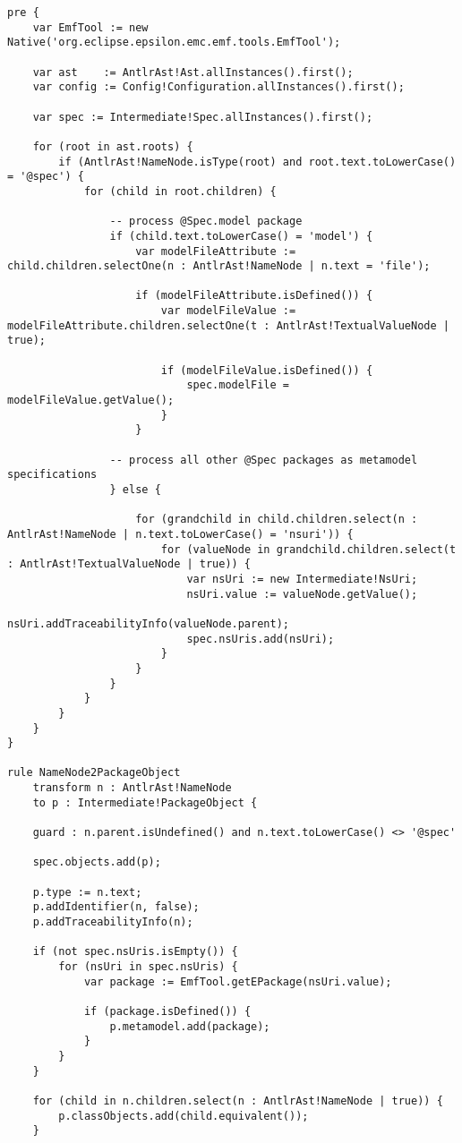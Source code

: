 \begin{lstlisting}[caption=Transforming AST models to intermediate models with ETL., label=lst:m2m_full, language=ETL]
pre {
	var EmfTool := new Native('org.eclipse.epsilon.emc.emf.tools.EmfTool');

	var ast    := AntlrAst!Ast.allInstances().first();
	var config := Config!Configuration.allInstances().first();
	
	var spec := Intermediate!Spec.allInstances().first();
	
	for (root in ast.roots) {
		if (AntlrAst!NameNode.isType(root) and root.text.toLowerCase() = '@spec') {		
			for (child in root.children) {		
			
				-- process @Spec.model package	
				if (child.text.toLowerCase() = 'model') {
					var modelFileAttribute := child.children.selectOne(n : AntlrAst!NameNode | n.text = 'file');
					
					if (modelFileAttribute.isDefined()) {
						var modelFileValue := modelFileAttribute.children.selectOne(t : AntlrAst!TextualValueNode | true);
						
						if (modelFileValue.isDefined()) {
							spec.modelFile = modelFileValue.getValue();	
						}
					}

				-- process all other @Spec packages as metamodel specifications
				} else {
				
					for (grandchild in child.children.select(n : AntlrAst!NameNode | n.text.toLowerCase() = 'nsuri')) {
						for (valueNode in grandchild.children.select(t : AntlrAst!TextualValueNode | true)) {
							var nsUri := new Intermediate!NsUri;
							nsUri.value := valueNode.getValue();
							nsUri.addTraceabilityInfo(valueNode.parent);
							spec.nsUris.add(nsUri);
						}
					}
				}
			}
		}
	}
}

rule NameNode2PackageObject
	transform n : AntlrAst!NameNode
	to p : Intermediate!PackageObject {
	
	guard : n.parent.isUndefined() and n.text.toLowerCase() <> '@spec'
	
	spec.objects.add(p);
	
	p.type := n.text;
	p.addIdentifier(n, false);
	p.addTraceabilityInfo(n);
	
	if (not spec.nsUris.isEmpty()) {
		for (nsUri in spec.nsUris) {
			var package := EmfTool.getEPackage(nsUri.value);
			
			if (package.isDefined()) {
				p.metamodel.add(package);
			}
		}
	}
	
	for (child in n.children.select(n : AntlrAst!NameNode | true)) {
		p.classObjects.add(child.equivalent());
	}
	

\end{lstlisting}
